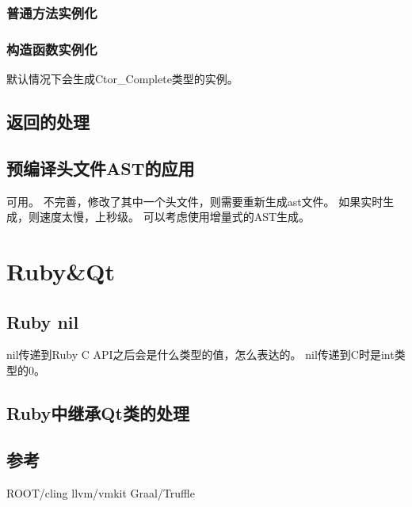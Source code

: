 \subsection{普通方法实例化}
\subsection{构造函数实例化}
默认情况下会生成Ctor\_Complete类型的实例。

\section{返回的处理}


\section{预编译头文件AST的应用}
可用。
不完善，修改了其中一个头文件，则需要重新生成ast文件。
如果实时生成，则速度太慢，上秒级。
可以考虑使用增量式的AST生成。

\chapter{Ruby&Qt}
\section{Ruby nil}
nil传递到Ruby C API之后会是什么类型的值，怎么表达的。
nil传递到C时是int类型的0。

\section{Ruby中继承Qt类的处理}


\section{参考}
ROOT/cling
llvm/vmkit
Graal/Truffle

